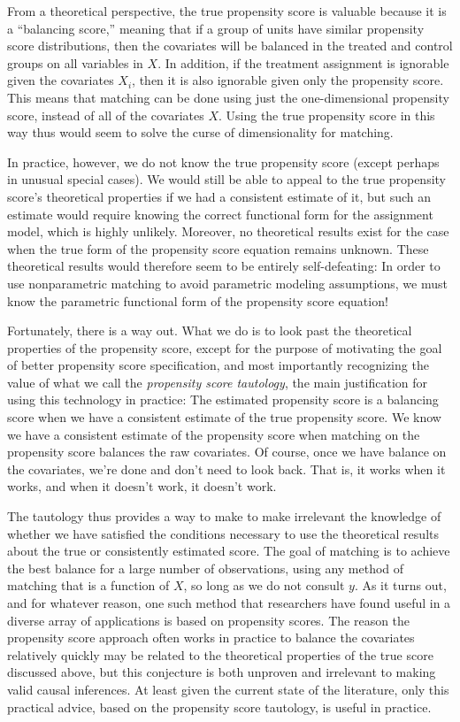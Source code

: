 \documentclass[11pt,titlepage]{article}
\begin{document}
From a theoretical perspective, the true propensity score is valuable
because it is a ``balancing score,'' meaning that if a group of units
have similar propensity score distributions, then the covariates will
be balanced in the treated and control groups on all variables in $X$.
In addition, if the treatment assignment is ignorable given the
covariates $X_i$, then it is also ignorable given only the propensity
score.  This means that matching can be done using just the
one-dimensional propensity score, instead of all of the covariates
$X$.  Using the true propensity score in this way thus would seem to
solve the curse of dimensionality for matching.

In practice, however, we do not know the true propensity score (except
perhaps in unusual special cases).  We would still be able to appeal
to the true propensity score's theoretical properties if we had a
consistent estimate of it, but such an estimate would require knowing
the correct functional form for the assignment model, which is highly
unlikely.  Moreover, no theoretical results exist for the case when
the true form of the propensity score equation remains unknown.  These
theoretical results would therefore seem to be entirely
self-defeating: In order to use nonparametric matching to avoid
parametric modeling assumptions, we must know the parametric
functional form of the propensity score equation!

Fortunately, there is a way out.  What we do is to look past the
theoretical properties of the propensity score, except for the purpose
of motivating the goal of better propensity score specification, and
most importantly recognizing the value of what we call the
\emph{propensity score tautology}, the main justification for using
this technology in practice: The estimated propensity score is a
balancing score when we have a consistent estimate of the true
propensity score.  We know we have a consistent estimate of the
propensity score when matching on the propensity score balances the
raw covariates.  Of course, once we have balance on the covariates,
we're done and don't need to look back.  That is, it works when it
works, and when it doesn't work, it doesn't work.

The tautology thus provides a way to make to make irrelevant the
knowledge of whether we have satisfied the conditions necessary to use
the theoretical results about the true or consistently estimated
score.  The goal of matching is to achieve the best balance for a
large number of observations, using any method of matching that is a
function of $X$, so long as we do not consult $y$.  As it turns out,
and for whatever reason, one such method that researchers have found
useful in a diverse array of applications is based on propensity
scores.  The reason the propensity score approach often works in
practice to balance the covariates relatively quickly may be related
to the theoretical properties of the true score discussed above, but
this conjecture is both unproven and irrelevant to making valid causal
inferences.  At least given the current state of the literature, only
this practical advice, based on the propensity score tautology, is
useful in practice.
\end{document}
